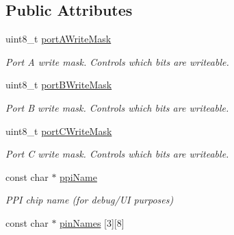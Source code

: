 \subsection*{Public Attributes}
\begin{DoxyCompactItemize}
\item 
\hypertarget{classIntel8255_a2b5cdceaa86b03a1d19c5c3f749f6d38}{uint8\-\_\-t \hyperlink{classIntel8255_a2b5cdceaa86b03a1d19c5c3f749f6d38}{port\-A\-Write\-Mask}}\label{classIntel8255_a2b5cdceaa86b03a1d19c5c3f749f6d38}

\begin{DoxyCompactList}\small\item\em Port A write mask. Controls which bits are writeable. \end{DoxyCompactList}\item 
\hypertarget{classIntel8255_a0cba5817d6d2b0017b8e71d1d5fca1d8}{uint8\-\_\-t \hyperlink{classIntel8255_a0cba5817d6d2b0017b8e71d1d5fca1d8}{port\-B\-Write\-Mask}}\label{classIntel8255_a0cba5817d6d2b0017b8e71d1d5fca1d8}

\begin{DoxyCompactList}\small\item\em Port B write mask. Controls which bits are writeable. \end{DoxyCompactList}\item 
\hypertarget{classIntel8255_aea9eef42c705822317af5fb69b6f5c35}{uint8\-\_\-t \hyperlink{classIntel8255_aea9eef42c705822317af5fb69b6f5c35}{port\-C\-Write\-Mask}}\label{classIntel8255_aea9eef42c705822317af5fb69b6f5c35}

\begin{DoxyCompactList}\small\item\em Port C write mask. Controls which bits are writeable. \end{DoxyCompactList}\item 
\hypertarget{classIntel8255_a4eb95c6f23bf4192324853afe9fe2178}{const char $\ast$ \hyperlink{classIntel8255_a4eb95c6f23bf4192324853afe9fe2178}{ppi\-Name}}\label{classIntel8255_a4eb95c6f23bf4192324853afe9fe2178}

\begin{DoxyCompactList}\small\item\em P\-P\-I chip name (for debug/\-U\-I purposes) \end{DoxyCompactList}\item 
\hypertarget{classIntel8255_a9b4ea7714e1b9df34052e269e7f06dfa}{const char $\ast$ \hyperlink{classIntel8255_a9b4ea7714e1b9df34052e269e7f06dfa}{pin\-Names} \mbox{[}3\mbox{]}\mbox{[}8\mbox{]}}\label{classIntel8255_a9b4ea7714e1b9df34052e269e7f06dfa}


\end{DoxyCompactItemize}
